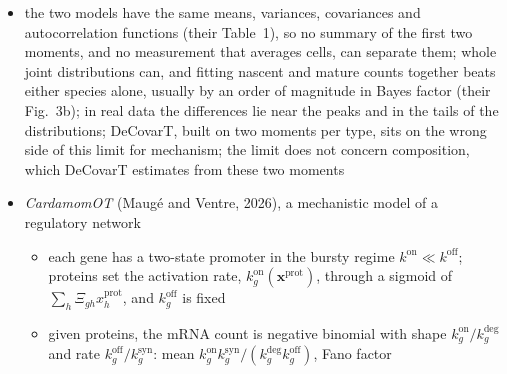 \begin{itemize}
        \(\varsigma/(\varsigma+k^{\mathrm{arr}})\)
  \begin{itemize}
    \item fast reversion or low gain: a rate constant in time and across cells, the constitutive model; nascent and
          mature counts are independent Poisson with means \(k^{\mathrm{tx}}/k^{\mathrm{spl}}\) and \(k^{\mathrm{tx}}/k^{\mathrm{deg}}\)
    \item slow reversion: a rate frozen in each cell but different between cells, the mixture model; mature counts are
          negative binomial with size \(\psi_{g}=k^{\mathrm{arr}}_{g}/k^{\mathrm{rev}}_{g}\)
    \item high gain: the two models part; \(\Gamma\)-OU gives geometric bursts, the usual bursty model, whose mean size we
          read as \(\varsigma_{g}/k^{\mathrm{rev}}_{g}\) at frequency \(k^{\mathrm{arr}}_{g}\); CIR gives an inverse-Gaussian-driven family with
          heavier tails
  \end{itemize}
  \item the two models have the same means, variances, covariances and autocorrelation functions (their Table~1), so no
        summary of the first two moments, and no measurement that averages cells, can separate them; whole joint
        distributions can, and fitting nascent and mature counts together beats either species alone, usually by an
        order of magnitude in Bayes factor (their Fig.~3b); in real data the differences lie near the peaks and in the
        tails of the distributions; DeCovarT, built on two moments per type, sits on the wrong side of this limit for
        mechanism; the limit does not concern composition, which DeCovarT estimates from these two moments
  \item \emph{CardamomOT} (Maugé and Ventre, 2026), a mechanistic model of a regulatory network
  \begin{itemize}
    \item each gene has a two-state promoter in the bursty regime \(k^{\mathrm{on}}\ll k^{\mathrm{off}}\); proteins set the activation rate,
          \(k^{\mathrm{on}}_{g}(\boldsymbol{x}^{\mathrm{prot}})\), through a sigmoid of \(\sum_{h}\Xi_{gh}x^{\mathrm{prot}}_{h}\), and \(k^{\mathrm{off}}_{g}\) is fixed
    \item given proteins, the mRNA count is negative binomial with shape \(k^{\mathrm{on}}_{g}/k^{\mathrm{deg}}_{g}\) and rate
          \(k^{\mathrm{off}}_{g}/k^{\mathrm{syn}}_{g}\): mean \(k^{\mathrm{on}}_{g}k^{\mathrm{syn}}_{g}/(k^{\mathrm{deg}}_{g}k^{\mathrm{off}}_{g})\), Fano factor

\end{itemize}
\end{itemize}
